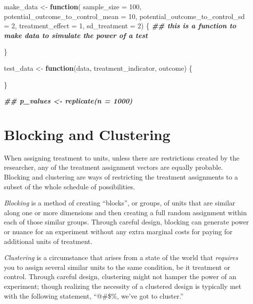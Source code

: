 \documentclass[
]{article}
\newenvironment{Shaded}{\begin{snugshade}}{\end{snugshade}}
\newcommand{\AttributeTok}[1]{\textcolor[rgb]{0.77,0.63,0.00}{#1}}
\newcommand{\ControlFlowTok}[1]{\textcolor[rgb]{0.13,0.29,0.53}{\textbf{#1}}}
\newcommand{\DecValTok}[1]{\textcolor[rgb]{0.00,0.00,0.81}{#1}}
\newcommand{\DocumentationTok}[1]{\textcolor[rgb]{0.56,0.35,0.01}{\textbf{\textit{#1}}}}
\newcommand{\NormalTok}[1]{#1}
\newcommand{\OtherTok}[1]{\textcolor[rgb]{0.56,0.35,0.01}{#1}}
\begin{document}
\begin{Shaded}
\begin{Highlighting}[]
\NormalTok{make\_data }\OtherTok{\textless{}{-}} \ControlFlowTok{function}\NormalTok{(}
  \AttributeTok{sample\_size                       =} \DecValTok{100}\NormalTok{,}
  \AttributeTok{potential\_outcome\_to\_control\_mean =} \DecValTok{10}\NormalTok{,}
  \AttributeTok{potential\_outcome\_to\_control\_sd   =} \DecValTok{2}\NormalTok{, }
  \AttributeTok{treatment\_effect                  =} \DecValTok{1}\NormalTok{, }
  \AttributeTok{sd\_treatment                      =} \DecValTok{2}\NormalTok{) \{ }
  \DocumentationTok{\#\# this is a function to make data to simulate the power of a test}
  
\NormalTok{  \}}
  
\NormalTok{test\_data }\OtherTok{\textless{}{-}} \ControlFlowTok{function}\NormalTok{(data, treatment\_indicator, outcome) \{}
  
\NormalTok{\}}
 
\DocumentationTok{\#\# p\_values \textless{}{-} replicate(n = 1000) }
\end{Highlighting}
\end{Shaded}

\hypertarget{blocking-and-clustering}{%
\section{Blocking and Clustering}\label{blocking-and-clustering}}

When assigning treatment to units, unless there are restrictions created by the researcher, any of the treatment assignment vectors are equally probable. Blocking and clustering are ways of restricting the treatment assignments to a subset of the whole schedule of possibilities.

\emph{Blocking} is a method of creating ``blocks'', or groups, of units that are similar along one or more dimensions and then creating a full random assignment within each of those similar groups. Through careful design, blocking can generate power or nuance for an experiment without any extra marginal costs for paying for additional units of treatment.

\emph{Clustering} is a circumstance that arises from a state of the world that \emph{requires} you to assign several similar units to the same condition, be it treatment or control. Through careful design, clustering might not hamper the power of an experiment; though realizing the necessity of a clustered design is typically met with the following statement, ``@\#\$\%, we've got to cluster.''
\end{document}
